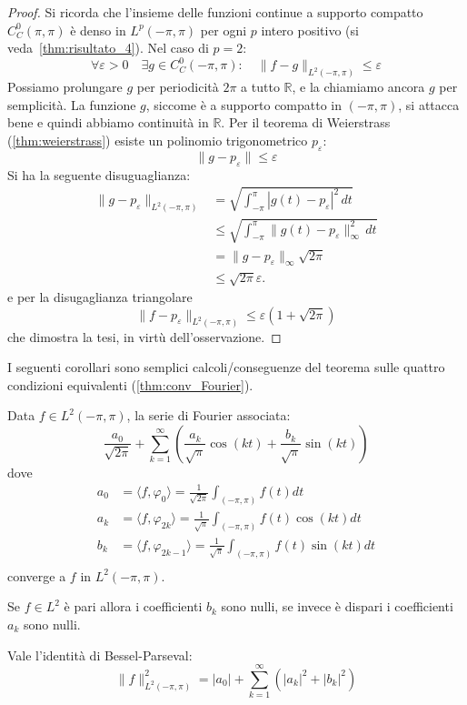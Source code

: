 \begin{proof}
    Si ricorda che l'insieme delle funzioni continue a supporto compatto
    \(C_C^0(\pi, \pi)\) è denso in \(L^p(-\pi, \pi)\) per ogni \(p\) intero
    positivo (si veda~\ref{thm:risultato_4}). Nel caso di \(p=2\):
    \[
        \forall \varepsilon >0 \quad \exists g \in C_C^0 (-\pi, \pi): \quad \| f-g\|_{L^2(-\pi, \pi) } \leq \varepsilon
    \]
    Possiamo prolungare \(g\) per periodicità \(2 \pi\) a tutto \(\mathbb R\), e
    la chiamiamo ancora \(g\) per semplicità. La funzione \(g\), siccome è a
    supporto compatto in \((-\pi, \pi)\), si attacca bene e quindi abbiamo
    continuità in \(\mathbb R\). Per il teorema di Weierstrass
    (\ref{thm:weierstrass}) esiste un polinomio trigonometrico
    \(p_\varepsilon\): 
    \[
    \| g - p_\varepsilon\| \leq \varepsilon
    \]
    Si ha la seguente disuguaglianza: 
   \[
    \begin{aligned}
        \|g - p_\varepsilon\|_{L^2(-\pi, \pi)} 
        &= \sqrt{\int_{-\pi}^\pi |g(t) - p_\varepsilon|^2 \, dt} \\
        &\leq \sqrt{\int_{-\pi}^\pi \|g(t) - p_\varepsilon\|_\infty^2 \, dt} \\
        &= \|g - p_\varepsilon\|_\infty \sqrt{2\pi} \\
        &\leq \sqrt{2\pi} \varepsilon.
    \end{aligned}
    \]
    e per la disugaglianza triangolare
    \[
    \|f-p_\varepsilon\|_{L^2(-\pi, \pi)} \leq \varepsilon(1+\sqrt{2\pi})
    \]
    che dimostra la tesi, in virtù dell'osservazione. 
\end{proof}
I seguenti corollari sono semplici calcoli/conseguenze del teorema sulle quattro
condizioni equivalenti (\ref{thm:conv_Fourier}). 
\begin{corollary}
    Data \(f \in L^2(-\pi, \pi)\), la serie di Fourier associata: 
    \[
    \frac{a_0}{\sqrt{2\pi}} + \sum_{k=1}^{\infty} \left( \frac{a_k}{\sqrt{\pi}} \cos(kt) + \frac{b_k}{\sqrt{\pi}} \sin(kt)\right)
    \]
    dove
    \[
    \begin{aligned}
        a_0 &= \langle f, \varphi_0 \rangle   = \frac{1}{\sqrt{2\pi}} \int_{(-\pi, \pi)} f(t) dt \\
        a_k &= \langle f, \varphi_{2k}\rangle = \frac{1}{\sqrt{\pi}} \int_{(-\pi, \pi)} f(t) \cos(kt) dt \\
        b_k &= \langle f, \varphi_{2k-1}\rangle = \frac{1}{\sqrt{\pi}} \int_{(-\pi, \pi)} f(t) \sin(kt) dt \\
    \end{aligned}
    \]
    converge a \(f\) in \(L^2(-\pi, \pi)\).
\end{corollary}
\begin{corollary}
    Se \(f \in L^2\) è pari allora i coefficienti \(b_k\) sono nulli, se invece è dispari i coefficienti 
    \(a_k\) sono nulli.
\end{corollary}
\begin{corollary}
    Vale l'identità di Bessel-Parseval: 
    \[\|f\|_{L^2(-\pi, \pi)}^2 = |a_0| + \sum_{k=1}^\infty (|a_k|^2+|b_k|^2)\]
\end{corollary}


